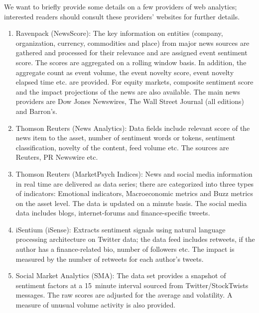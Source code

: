 We want to briefly provide some details on a few providers of web analytics; interested readers should consult these providers' websites for further details.

\begin{enumerate}[--]
\item Ravenpack (NewsScore): The key information on entities (company, organization, currency, commodities and place) from major news sources are gathered and processed for their relevance and are assigned event sentiment score. The scores are aggregated on a rolling window basis. In addition, the aggregate count as event volume, the event novelty score, event novelty elapsed time etc. are provided. For equity markets, composite sentiment score and the impact projections of the news are also available. The main news providers are Dow Jones Newswires, The Wall Street Journal (all editions) and Barron's. 

\item Thomson Reuters (News Analytics): Data fields include relevant score of the news item to the asset, number of sentiment words or tokens, sentiment classification, novelty of the content, feed volume etc. The sources are Reuters, PR Newswire etc. 

\item Thomson Reuters (MarketPsych Indices): News and social media information in real time are delivered as data series; there are categorized into three types of indicators: Emotional indicators, Macroeconomic metrics and Buzz metrics on the asset level. The data is updated on a minute basis. The social media data includes blogs, internet-forums and finance-specific tweets.

\item iSentium (iSense): Extracts sentiment signals using natural language processing architecture on Twitter data; the data feed includes retweets, if the author has a finance-related bio, number of followers etc. The impact is measured by the number of retweets for each author's tweets. 

\item Social Market Analytics (SMA): The data set provides a snapshot of sentiment factors at a 15~minute interval sourced from Twitter/StockTwists messages. The raw scores are adjusted for the average and volatility. A measure of unusual volume activity is also provided. 
\end{enumerate}


